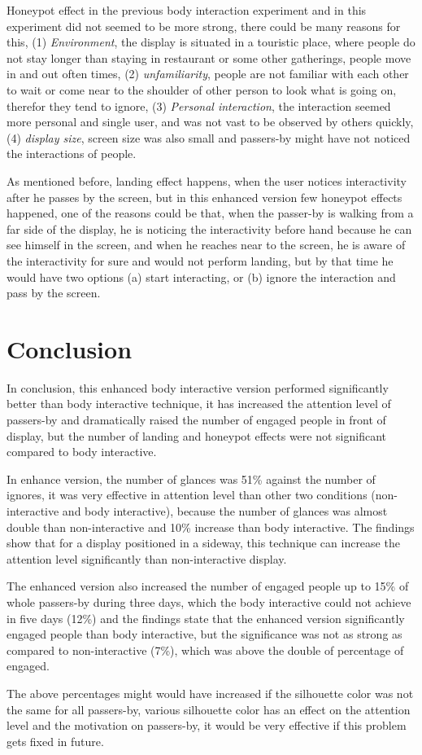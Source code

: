 Honeypot effect in the previous body interaction experiment and in this experiment did not seemed to be more strong, there could be many reasons for this, (1) \emph{Environment}, the display is situated in a touristic place, where people do not stay longer than staying in restaurant or some other gatherings, people move in and out often times, (2) \emph{unfamiliarity}, people are not familiar with each other to wait or come near to the shoulder of other person to look what is going on, therefor they tend to ignore, (3) \emph{Personal interaction}, the interaction seemed more personal and single user,  and was not vast to be observed by others quickly, (4) \emph{display size}, screen size was also small and passers-by might have not noticed the interactions of people.

As mentioned before, landing effect happens, when the user notices interactivity after he passes by the screen, but in this enhanced version few honeypot effects happened, one of the reasons could be that, when the passer-by is walking from a far side of the display, he is noticing the interactivity before hand because he can see himself in the screen, and when he reaches near to the screen, he is aware of the interactivity for sure and would not perform landing, but by that time he would have two options (a) start interacting, or (b) ignore the interaction and pass by the screen.

\section{Conclusion}
In conclusion, this enhanced body interactive version performed significantly better than body interactive technique, it has increased the attention level of passers-by and dramatically raised the number of engaged people in front of display, but the number of landing and honeypot effects were not significant compared to body interactive. 

In enhance version, the number of glances was 51\% against the number of ignores, it was very effective in attention level than other two conditions (non-interactive and body interactive), because the number of glances was almost double than non-interactive and 10\% increase than body interactive. The findings show that for a display positioned in a sideway, this technique can increase the attention level significantly than non-interactive display.

The enhanced version also increased the number of engaged people up to 15\% of whole passers-by during three days, which the body interactive could not achieve in five days (12\%) and the findings state that the enhanced version significantly engaged people than body interactive, but the significance was not as strong as compared to non-interactive (7\%), which was above the double of percentage of engaged. 

The above percentages might would have increased if the silhouette color was not the same for all passers-by, various silhouette color has an effect on the attention level and the motivation on passers-by, it would be very effective if this problem gets fixed in future. 




